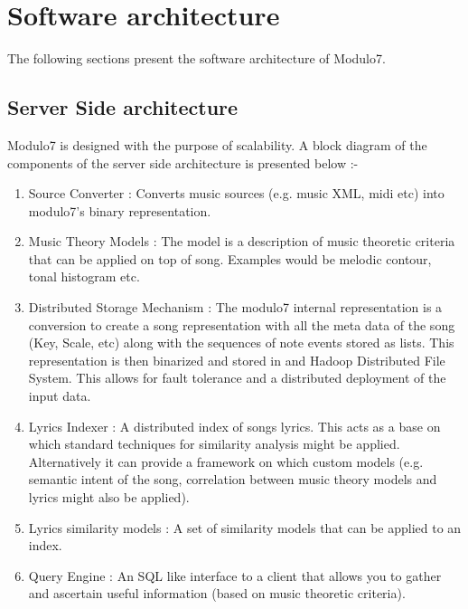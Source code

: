 \chapter{Software architecture}
The following sections present the software architecture of Modulo7.
\section{Server Side architecture}
\noindent Modulo7 is designed with the purpose of scalability. A block diagram of the components of the server side architecture is presented below :-
\begin{enumerate}
\item Source Converter : Converts music sources (e.g. music XML, midi etc) into modulo7's binary representation.
\item Music Theory Models : The model is a description of music theoretic criteria that can be applied on top of song. Examples would be melodic contour, tonal histogram etc. 
\item Distributed Storage Mechanism : The modulo7 internal representation is a conversion to create a song representation with all the meta data of the song (Key, Scale,  etc) along with the sequences of note events stored as lists. This representation is then binarized and stored in and Hadoop Distributed File System. This allows for fault tolerance and a distributed deployment of the input data.
\item Lyrics Indexer : A distributed index of songs lyrics. This acts as a base on which standard techniques for similarity analysis might be applied. Alternatively it can provide a framework on which custom models (e.g. semantic intent of the song, correlation between music theory models and lyrics might also be applied).  
\item Lyrics similarity models : A set of similarity models that can be applied to an index. 
\item Query Engine : An SQL like interface to a client that allows you to gather and ascertain useful information (based on music theoretic criteria). 
\end{enumerate}

